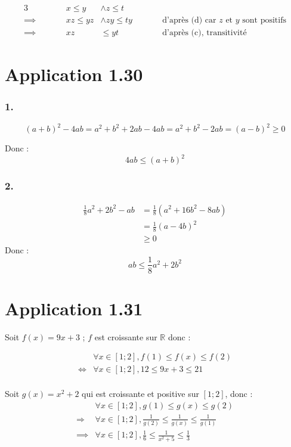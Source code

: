 \documentclass{report}
\begin{document}
\begin{alignat*}{3}
	        &\qquad &  x \leq y  &\wedge z\leq t\\
	\implies&       & xz \leq yz &\wedge zy \leq ty &\qquad &\text{d'après (d) car $z$ et $y$ sont positifs} \\
	\implies&       &         xz &\leq yt           &       &\text{d'après (c), transitivité}
\end{alignat*}

\section*{Application 1.30}
\subsubsection*{1.}

\[(a+b)^2 - 4ab = a^2 + b^2 + 2ab - 4 ab = a^2 + b^2 - 2ab = (a-b)^2 \ge 0\]

Donc :
\[4ab \le (a+b)^2\]

\subsubsection*{2.}
\begin{equation*}
	\begin{split}
		\frac{1}{8}a^2 + 2b^2 - ab &= \frac{1}{8}(a^2+16b^2-8ab) \\
		                           &= \frac{1}{8}(a-4b)^2 \\
		                           &\ge 0
	\end{split}
\end{equation*}	
Donc : \[ab \le\frac{1}{8}a^2 + 2b^2\]

\section*{Application 1.31}

Soit $f(x) = 9x+3$ ; $f$ est croissante sur $\mathbb{R}$ donc :

\begin{equation*}
	\begin{split}
		& \forall x \in [1 ; 2], f(1) \le f(x) \le f(2) \\
		\Longleftrightarrow & \forall x \in [1 ; 2], 12 \le 9x+3 \le 21 \\
	\end{split}
\end{equation*}

Soit $g(x)=x^2+2$ qui est croissante et positive sur $[1;2]$, donc :
\begin{equation*}
	\begin{split}
		                & \forall x \in [1 ; 2], g(1) \le g(x) \le g(2) \\
		\Longrightarrow & \forall x \in [1 ; 2], \frac{1}{g(2)} \le \frac{1}{g(x)} \le \frac{1}{g(1)} \\
		\implies        & \forall x \in [1 ; 2], \frac{1}{6} \le \frac{1}{x^2+5} \le \frac{1}{3} \\
	\end{split}
\end{equation*}
\end{document}
